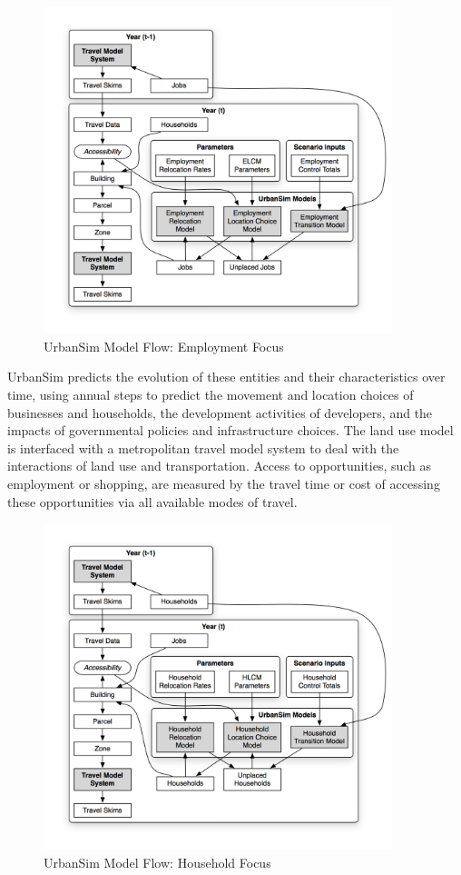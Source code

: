 \begin{figure}[h]
\center
 \includegraphics[width=4in]{graphics/ParcelEmploymentModel.png}
\caption{UrbanSim Model Flow: Employment Focus}
\label{fig:employment-models}
\end{figure}

UrbanSim predicts the evolution of these entities and their characteristics over time, using annual steps to predict the movement and location choices of businesses and households, the development activities of developers, and the impacts of governmental policies and infrastructure choices.  The land use model is interfaced with a metropolitan travel model system to deal with the interactions of land use and transportation. Access to opportunities, such as employment or shopping, are measured by the travel time or cost of accessing these opportunities via all available modes of travel.


\begin{figure}[h]
\center
 \includegraphics[width=4in]{graphics/ParcelHouseholdModel.png}
\caption{UrbanSim Model Flow: Household Focus}
\label{fig:household-models}
\end{figure}
\clearpage

